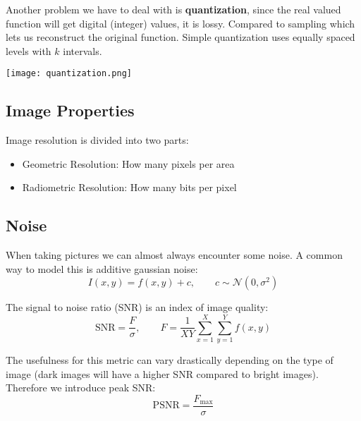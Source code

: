 Another problem we have to deal with is \textbf{quantization}, since the real valued function will get digital (integer) values, it is lossy. Compared to sampling which lets us reconstruct the original function. Simple quantization uses equally spaced levels with $k$ intervals.

\begin{center}
	\texttt{[image: quantization.png]}
\end{center}

\subsection{Image Properties}

Image resolution is divided into two parts:
\begin{itemize}
	\item Geometric Resolution: How many pixels per area
	\item Radiometric Resolution: How many bits per pixel
\end{itemize}

\subsection{Noise}

When taking pictures we can almost always encounter some noise. A common way to model this is additive gaussian noise:
$$I(x,y) = f(x,y) + c, \qquad c \sim \mathcal N(0, \sigma^2)$$

The signal to noise ratio (SNR) is an index of image quality:
$$\text{SNR} = \frac{F}{\sigma}, \qquad F = \frac{1}{XY} \sum_{x=1}^{X}\sum_{y=1}^{Y} f(x,y)$$

The usefulness for this metric can vary drastically depending on the type of image (dark images will have a higher SNR compared to bright images). Therefore we introduce peak SNR:
$$\text{PSNR} = \frac{F_\text{max}}{\sigma}$$